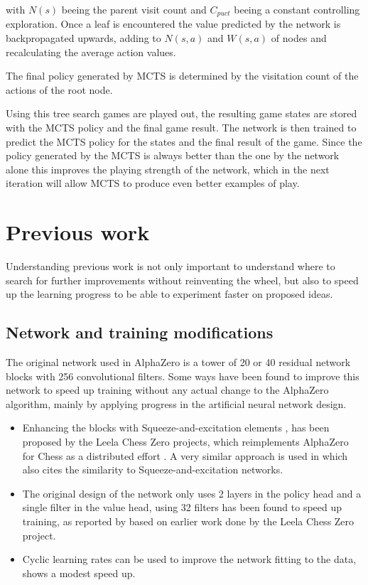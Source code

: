 \documentclass[12pt,onecolumn,oneside,titlepage]{article}
\begin{document}
with $N(s)$ beeing the parent visit count and $C_{puct}$ beeing a constant controlling exploration.
Once a leaf is encountered the value predicted by the network is backpropagated upwards, adding to $N(s,a)$ and $W(s,a)$ of nodes and recalculating the average action values.

The final policy generated by MCTS is determined by the visitation count of the actions of the root node.

Using this tree search games are played out, the resulting game states are stored with the MCTS policy and the final game result. The network is then trained to predict the MCTS policy for the states and the final result of the game.
Since the policy generated by the MCTS is always better than the one by the network alone this improves the playing strength of the network, which in the next iteration will allow MCTS to produce even better examples of play.

\section{Previous work}

Understanding previous work is not only important to understand where to search for further improvements without reinventing the wheel, but also to speed up the learning progress to be able to experiment faster on proposed ideas.

\subsection{Network and training modifications}

The original network used in AlphaZero is a tower of 20 or 40 residual network blocks with 256 convolutional filters. Some ways have been found to improve this network to speed up training without any actual change to the AlphaZero algorithm, mainly by applying progress in the artificial neural network design.

\begin{itemize}
 \item Enhancing the blocks with Squeeze-and-excitation elements \cite{hu2018squeeze}, has been proposed by the Leela Chess Zero projects, which reimplements AlphaZero for Chess as a distributed effort \cite{leela0sq}.
       A very similar approach is used in \cite{wu2019accelerating} which also cites the similarity to Squeeze-and-excitation networks.
 \item The original design of the network only uses 2 layers in the policy head and a single filter in the value head, using 32 filters has been found to speed up training, as reported by \cite{oracledevs6} based on earlier work done by the Leela Chess Zero project.
 \item Cyclic learning rates can be used to improve the network fitting to the data, \cite{oracledevs6} shows a modest speed up.
\end{itemize}
\end{document}
